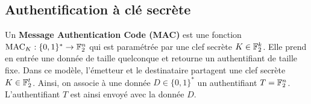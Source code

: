 \documentclass{llncs}[11pt]
\begin{document}
\subsection{Authentification à clé secrète}


\begin{definition}
Un {\bf Message Authentication Code (MAC)} est une fonction  ${\rm MAC}_K : \{0,1\}^* \to  \mathbb{F}_2^n$ qui est paramétrée par une clef secrète $K \in \mathbb{F}_2^k$.
Elle prend en entrée une donnée de taille quelconque et retourne un authentifiant de taille fixe. Dans ce modèle, l'émetteur et le destinataire  partagent une clef secrète $K \in \mathbb{F}_2^t$. Ainsi, on associe à une donnée $D \in  \{0,1\}^*$ un authentifiant  $T=\mathbb{F}_2^n$. L'authentifiant $T$ est ainsi envoyé avec la donnée $D$.         

\end{definition}


%





\appendix
\end{document}
